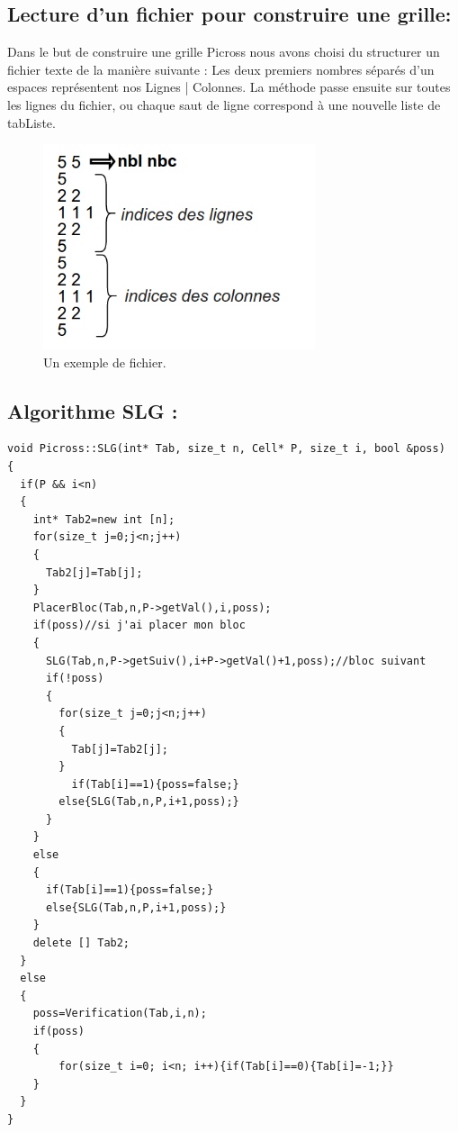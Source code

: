 \documentclass{article}
\begin{document}
\subsection{Lecture d'un fichier pour construire une grille:}
Dans le but de construire une grille Picross nous avons choisi du structurer un fichier texte de la manière suivante :\newline
Les deux premiers nombres séparés d'un espaces représentent nos Lignes | Colonnes.
La méthode passe ensuite sur toutes les lignes du fichier, ou chaque saut de ligne correspond à une nouvelle liste de tabListe.
\begin{figure}[h]
\begin{center}
\includegraphics[width=8cm]{ex2}
\end{center}
\caption{Un exemple de fichier.}
\end{figure}
\newpage
\subsection{Algorithme SLG :}
\begin{verbatim}
void Picross::SLG(int* Tab, size_t n, Cell* P, size_t i, bool &poss)
{
  if(P && i<n)
  {
    int* Tab2=new int [n];
    for(size_t j=0;j<n;j++)
    {
      Tab2[j]=Tab[j];
    }
    PlacerBloc(Tab,n,P->getVal(),i,poss);
    if(poss)//si j'ai placer mon bloc
    {
      SLG(Tab,n,P->getSuiv(),i+P->getVal()+1,poss);//bloc suivant
      if(!poss)
      {
        for(size_t j=0;j<n;j++)
        {
          Tab[j]=Tab2[j];
        }
	      if(Tab[i]==1){poss=false;}
        else{SLG(Tab,n,P,i+1,poss);}
      }
    }
    else
    {
      if(Tab[i]==1){poss=false;}
      else{SLG(Tab,n,P,i+1,poss);}
    }
    delete [] Tab2;
  }
  else
  {
    poss=Verification(Tab,i,n);
    if(poss)
    {
	    for(size_t i=0; i<n; i++){if(Tab[i]==0){Tab[i]=-1;}}
    }
  }
}
\end{verbatim}
\newpage
\end{document}
